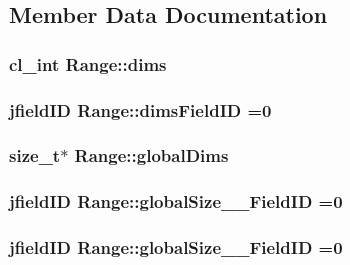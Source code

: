 \subsection{Member Data Documentation}
\hypertarget{class_range_a38f24294ffc465eb04c849264d77c09e}{
\subsubsection[{dims}]{\setlength{\rightskip}{0pt plus 5cm}cl\-\_\-int Range\-::dims}}\label{class_range_a38f24294ffc465eb04c849264d77c09e}
\hypertarget{class_range_a8907be4a3b95999af18bfad3ebd61715}{
\subsubsection[{dims\-Field\-I\-D}]{\setlength{\rightskip}{0pt plus 5cm}jfield\-I\-D Range\-::dims\-Field\-I\-D =0\hspace{0.3cm}{\ttfamily [static]}}}\label{class_range_a8907be4a3b95999af18bfad3ebd61715}
\hypertarget{class_range_af04212e4c0ca0751e0a14cbb7bba6854}{
\subsubsection[{global\-Dims}]{\setlength{\rightskip}{0pt plus 5cm}size\-\_\-t$\ast$ Range\-::global\-Dims}}\label{class_range_af04212e4c0ca0751e0a14cbb7bba6854}
\hypertarget{class_range_a0b43dc3343e94101137e1db90e480d53}{
\subsubsection[{global\-Size\-\_\-0\-\_\-\-Field\-I\-D}]{\setlength{\rightskip}{0pt plus 5cm}jfield\-I\-D Range\-::global\-Size\-\_\-\_\-\-Field\-I\-D =0\hspace{0.3cm}{\ttfamily [static]}}}\label{class_range_a0b43dc3343e94101137e1db90e480d53}
\hypertarget{class_range_a34d05104233672f3788a8f4defccf3d5}{
\subsubsection[{global\-Size\-\_\-1\-\_\-\-Field\-I\-D}]{\setlength{\rightskip}{0pt plus 5cm}jfield\-I\-D Range\-::global\-Size\-\_\-\_\-\-Field\-I\-D =0\hspace{0.3cm}{\ttfamily [static]}}}\label{class_range_a34d05104233672f3788a8f4defccf3d5}
